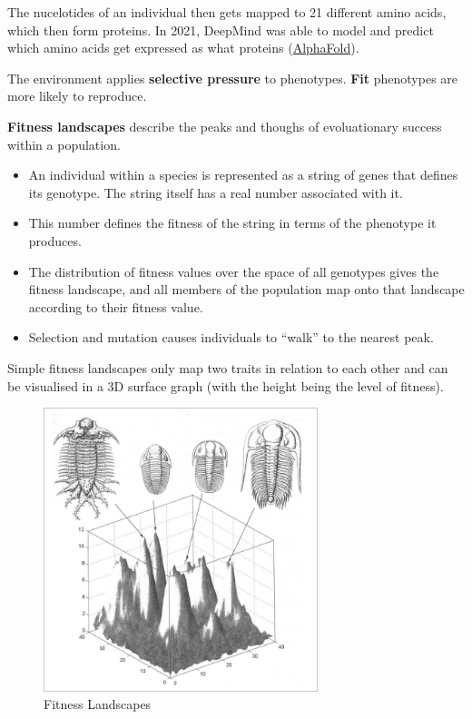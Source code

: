 The nucelotides of an individual then gets mapped to 21 different amino acids, which then form proteins. In 2021, DeepMind was able to model and predict which amino acids get expressed as what proteins (\href{https://deepmind.com/research/open-source/alphafold-protein-structure-database}{AlphaFold}).

The environment applies \textbf{selective pressure} to phenotypes. \textbf{Fit} phenotypes are more likely to reproduce.

\textbf{Fitness landscapes} describe the peaks and thoughs of evoluationary success within a population. 

\begin{itemize}
    \item An individual within a species is represented as a string of genes that defines its genotype. The string itself has a real number associated with it.
    \item This number defines the fitness of the string in terms of the phenotype it produces.
    \item The distribution of fitness values over the space of all genotypes gives the fitness landscape, and all members of the population map onto that landscape according to their fitness value.
    \item Selection and mutation causes individuals to ``walk'' to the nearest peak.
\end{itemize}

Simple fitness landscapes only map two traits in relation to each other and can be visualised in a 3D surface graph (with the height being the level of fitness).

\begin{figure}[h]
    \centering
    \includegraphics[width=8cm]{fitnesslandscape}
    \caption{Fitness Landscapes}
    \label{fig:fitness}
\end{figure}

